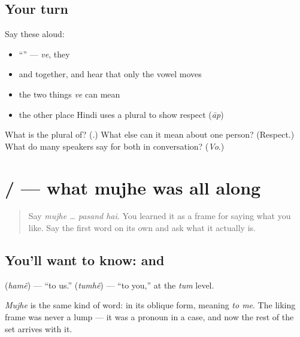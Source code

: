 \subsection*{Your turn}
Say these aloud:

\begin{itemize}
\raggedright
  \item \textquotedblleft{}\textquotedblright{} — \emph{ve}, they
  \item \textbf{} and \textbf{} together, and hear that only the vowel moves
  \item the two things \emph{ve} can mean
  \item the other place Hindi uses a plural to show respect (\emph{āp})
\end{itemize}

\begin{tcolorbox}[breakable,colback=teal!4,colframe=teal!35!black,title={Before you move on}]
What is \textbf{} the plural of? (\textbf{}.) What else can it mean about one person? (Respect.) What do many speakers say for both in conversation? (\emph{Vo}.)
\end{tcolorbox}
\section[\texorpdfstring{\hi{हमें} / \hi{तुम्हें} (hamẽ / tumhẽ)}{हमें / तुम्हें (hamẽ / tumhẽ)}]{ /  — what mujhe was all along}

\label{lesson:HI-C86-hamen-tumhen}



\begin{quote}
Say \emph{mujhe … pasand hai}. You learned it as a frame for saying what you like. Say the first word on its own and ask what it actually is.
\end{quote}

\subsection*{You'll want to know:  and }
\textbf{} (\emph{hamẽ}) — \textquotedblleft{}to us.\textquotedblright{} \textbf{} (\emph{tumhẽ}) — \textquotedblleft{}to you,\textquotedblright{} at the \emph{tum} level.

\emph{Mujhe} is the same kind of word: \textbf{} in its oblique form, meaning \emph{to me}. The liking frame was never a lump — it was a pronoun in a case, and now the rest of the set arrives with it.

